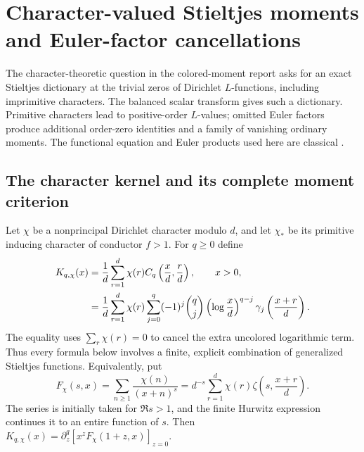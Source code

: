 \section{Character-valued Stieltjes moments and Euler-factor cancellations}
\label{stchar:section}

The character-theoretic question in the colored-moment report
\cite{stcol:report} asks for an exact Stieltjes dictionary at the trivial
zeros of Dirichlet $L$-functions, including imprimitive characters.
The balanced scalar transform gives such a dictionary.  Primitive
characters lead to positive-order $L$-values; omitted Euler factors
produce additional order-zero identities and a family of vanishing
ordinary moments.  The functional equation and Euler products used
here are classical \cite{stchar:classical}.

\subsection{The character kernel and its complete moment criterion}

Let $\chi$ be a nonprincipal Dirichlet character modulo $d$, and let
$\chi_*$ be its primitive inducing character of conductor $f>1$.
For $q\ge0$ define
\begin{align}
 K_{q,\chi}(x)&=\frac1d\sum_{r=1}^d\chi(r)
              C_q\left(\frac xd,\frac rd\right),\qquad x>0,
              \label{stchar:kernel}\\
 &=\frac1d\sum_{r=1}^d\chi(r)\sum_{j=0}^q(-1)^j\binom qj
       \left(\log\frac xd\right)^{q-j}
       \gamma_j\left(\frac{x+r}{d}\right).\notag
\end{align}
The equality uses $\sum_r\chi(r)=0$ to cancel the extra uncolored
logarithmic term.  Thus every formula below involves a finite, explicit
combination of generalized Stieltjes functions.  Equivalently, put
\[
 F_\chi(s,x)=\sum_{n\ge1}\frac{\chi(n)}{(x+n)^s}
    =d^{-s}\sum_{r=1}^d\chi(r)\zeta\left(s,\frac{x+r}{d}\right).
\]
The series is initially taken for $\Re s>1$, and the finite Hurwitz
expression continues it to an entire function of $s$.  Then
$K_{q,\chi}(x)=\partial_z^q[x^zF_\chi(1+z,x)]_{z=0}$.

